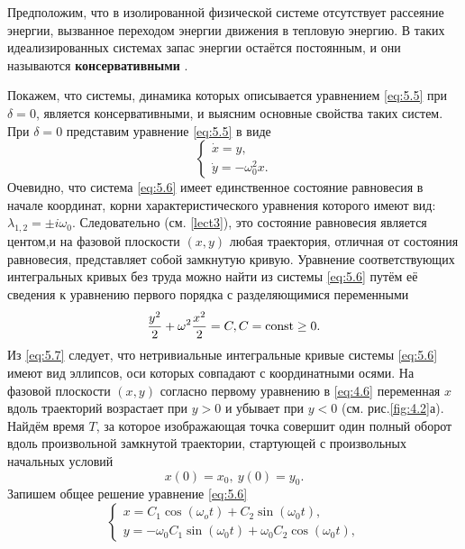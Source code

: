 Предположим, что в изолированной физической системе отсутствует
рассеяние энергии, вызванное переходом энергии движения в тепловую
энергию. В таких идеализированных системах запас энергии остаётся
постоянным, и они называются \textbf{консервативными} .

Покажем, что системы, динамика которых описывается уравнением \eqref{eq:5.5}    
при $\delta = 0$, является консервативными, и выясним основные свойства таких
систем. При $\delta = 0$ представим уравнение \eqref{eq:5.5} в виде
\begin{equation}
        \label{eq:5.6}
        \begin{cases}
                \dot x = y, \\
                \dot y = - \omega_0^2 x.
        \end{cases}
\end{equation}
Очевидно, что система \eqref{eq:5.6} имеет единственное состояние равновесия в начале координат, корни характеристического уравнения которого имеют вид: $\lambda_{1,2} = \pm i \omega_0$. Следовательно (см. \ref{lect3}), это состояние равновесия является центом,и на фазовой плоскости $(x,y)$ любая траектория, отличная от состояния
равновесия, представляет собой замкнутую кривую. Уравнение
соответствующих интегральных кривых без труда можно найти из системы
 \eqref{eq:5.6} путём её сведения к уравнению первого порядка с разделяющимися
переменными 
\begin{equation}
        \label{eq:5.7}
        \frac{y^2}{2} + \omega^2 \frac{x^2}{2} = C, C= \textrm{const}\geq0.
\end{equation}
Из \eqref{eq:5.7} следует, что нетривиальные интегральные кривые системы \eqref{eq:5.6} имеют вид эллипсов, оси которых совпадают с координатными осями. На фазовой плоскости $(x,y)$ согласно первому уравнению
в \eqref{eq:4.6} переменная $x$ вдоль траекторий возрастает при $y>0$ и убывает при $y<0$ (см. рис.\ref{fig:4.2}а). Найдём время $T$, за которое изображающая точка совершит один полный оборот вдоль произвольной замкнутой траектории, стартующей с произвольных начальных условий
\begin{equation}
        \label{eq:5.8}
        x(0) = x_0,~ y(0) = y_0 . 
\end{equation}
Запишем общее решение уравнение \eqref{eq:5.6}
\begin{equation}
        \label{eq:5.9}
        \begin{cases}
                x = C_1 \cos(\omega_o t) + C_2 \sin(\omega_0t), \\
                y = - \omega_0 C_1 \sin(\omega_0t) +\omega_0C_2\cos(\omega_0t),
        \end{cases}
\end{equation}
